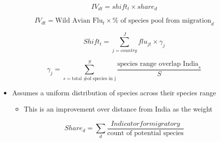 \documentclass[
  letterpaper,
]{article}
\providecommand{\tightlist}{%
  \setlength{\itemsep}{0pt}\setlength{\parskip}{0pt}}\usepackage{longtable,booktabs,array}
\begin{document}
\begin{tcolorbox}
\[
IV_{dt} = shift_t \times share_d
\]

\[
IV_{dt} = \text{Wild Avian Flu}_t \times \text{%
\]

\[
Shift_t = \sum_{j = country}^J flu_{jt} \times \gamma_j
\]

\[
\gamma_j = \sum_{s =\text{total \# of species in j}}^S \frac{\text{species range overlap India}_s}{S}
\]

\begin{itemize}
\tightlist
\item
  Assumes a uniform distribution of species across their species range

  \begin{itemize}
  \tightlist
  \item
    This is an improvement over distance from India as the weight
  \end{itemize}
\end{itemize}

\[
Share_d = \sum_d \frac{Indicator for migratory}{\text{count of potential species}}
\]

\end{tcolorbox}
\end{document}
